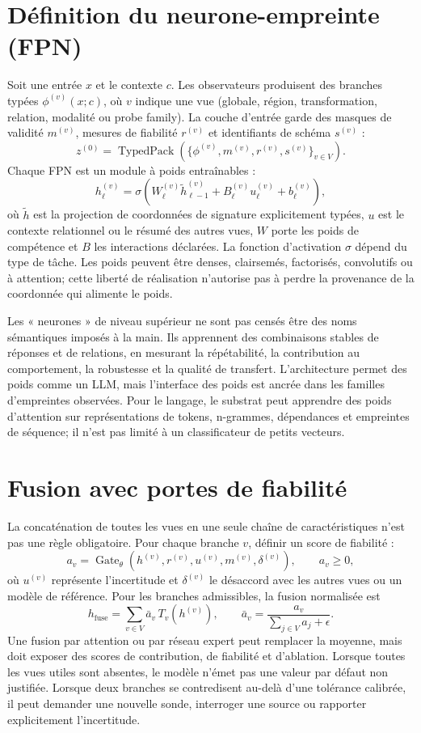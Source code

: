 \documentclass[11pt,a4paper]{report}
\begin{document}
\section{Définition du neurone-empreinte (FPN)}
Soit une entrée $x$ et le contexte $c$. Les observateurs produisent des branches typées $\phi^{(v)}(x;c)$, où $v$ indique une vue (globale, région, transformation, relation, modalité ou probe family). La couche d'entrée garde des masques de validité $m^{(v)}$, mesures de fiabilité $r^{(v)}$ et identifiants de schéma $s^{(v)}$ :
\[
 z^{(0)}=\operatorname{TypedPack}\!\left(\{\phi^{(v)},m^{(v)},r^{(v)},s^{(v)}\}_{v\in V}\right).
\]
Chaque FPN est un module à poids entraînables :
\[
 h_{\ell}^{(v)}=\sigma\!\left(W_{\ell}^{(v)}\tilde h_{\ell-1}^{(v)}+B_{\ell}^{(v)}u_{\ell}^{(v)}+b_{\ell}^{(v)}\right),
\]
où $\tilde h$ est la projection de coordonnées de signature explicitement typées, $u$ est le contexte relationnel ou le résumé des autres vues, $W$ porte les poids de compétence et $B$ les interactions déclarées. La fonction d'activation $\sigma$ dépend du type de tâche. Les poids peuvent être denses, clairsemés, factorisés, convolutifs ou à attention; cette liberté de réalisation n'autorise pas à perdre la provenance de la coordonnée qui alimente le poids.

Les « neurones » de niveau supérieur ne sont pas censés être des noms sémantiques imposés à la main. Ils apprennent des combinaisons stables de réponses et de relations, en mesurant la répétabilité, la contribution au comportement, la robustesse et la qualité de transfert. L'architecture permet des poids comme un LLM, mais l'interface des poids est ancrée dans les familles d'empreintes observées. Pour le langage, le substrat peut apprendre des poids d'attention sur représentations de tokens, n-grammes, dépendances et empreintes de séquence; il n'est pas limité à un classificateur de petits vecteurs.

\section{Fusion avec portes de fiabilité}
La concaténation de toutes les vues en une seule chaîne de caractéristiques n'est pas une règle obligatoire. Pour chaque branche $v$, définir un score de fiabilité :
\[
 a_v=\operatorname{Gate}_{\theta}\left(h^{(v)},r^{(v)},u^{(v)},m^{(v)},\delta^{(v)}\right),
 \qquad a_v\geq0,
\]
où $u^{(v)}$ représente l'incertitude et $\delta^{(v)}$ le désaccord avec les autres vues ou un modèle de référence. Pour les branches admissibles, la fusion normalisée est
\[
 h_{\mathrm{fuse}}=\sum_{v\in V} \bar a_v\,T_v(h^{(v)}),\qquad
 \bar a_v=\frac{a_v}{\sum_{j\in V}a_j+\epsilon}.
\]
Une fusion par attention ou par réseau expert peut remplacer la moyenne, mais doit exposer des scores de contribution, de fiabilité et d'ablation. Lorsque toutes les vues utiles sont absentes, le modèle n'émet pas une valeur par défaut non justifiée. Lorsque deux branches se contredisent au-delà d'une tolérance calibrée, il peut demander une nouvelle sonde, interroger une source ou rapporter explicitement l'incertitude.
\end{document}
